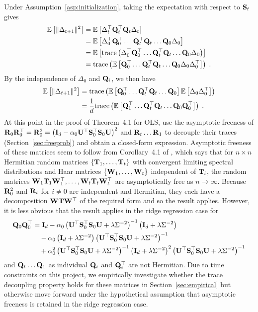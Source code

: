 Under Assumption~\ref{asp:initialization}, taking the expectation with respect to $\mathbf{S}_t$ gives
\begin{align*}
\mathbb{E}\left[\|\Delta_{t+1}\|^2\right] &= \mathbb{E}\left[\Delta_t^\top\mathbf{Q}_t^\top\mathbf{Q}_t\Delta_t\right] \\
&= \mathbb{E}\left[\Delta_0^\top\mathbf{Q}_0^\top\ldots \mathbf{Q}_t^\top\mathbf{Q}_t\ldots\mathbf{Q}_0\Delta_0\right] \\
&= \mathbb{E}\left[\mathrm{trace}\left(\Delta_0^\top\mathbf{Q}_0^\top\ldots \mathbf{Q}_t^\top\mathbf{Q}_t\ldots\mathbf{Q}_0\Delta_0\right)\right] \\
&= \mathrm{trace}\left(\mathbb{E}\left[\mathbf{Q}_0^\top\ldots \mathbf{Q}_t^\top\mathbf{Q}_t\ldots\mathbf{Q}_0\Delta_0\Delta_0^\top\right]\right) \;.
\end{align*}
By the independence of $\Delta_0$ and $\mathbf{Q}_i$, we then have
\begin{align*}
\mathbb{E}\left[\|\Delta_{t+1}\|^2\right] &= \mathrm{trace}\left(\mathbb{E}\left[\mathbf{Q}_0^\top\ldots \mathbf{Q}_t^\top\mathbf{Q}_t\ldots\mathbf{Q}_0\right]\mathbb{E}\left[\Delta_0\Delta_0^\top\right]\right) \\
&= \frac{1}{d}\mathrm{trace}\left(\mathbb{E}\left[\mathbf{Q}_1^\top\ldots \mathbf{Q}_t^\top\mathbf{Q}_t\ldots\mathbf{Q}_0\mathbf{Q}_0^\top\right]\right) \;.
\end{align*}
At this point in the proof of Theorem~4.1 for OLS, \citet{Lacotte:2020} use the asymptotic freeness of $\mathbf{R}_0\mathbf{R}_0^\top=\mathbf{R}_0^2=\left(\mathbf{I}_d-\alpha_0\mathbf{U}^\top\mathbf{S}_0^\top\mathbf{S}_0\mathbf{U}\right)^2$ and $\mathbf{R}_t\ldots\mathbf{R}_1$ to decouple their traces (Section~\ref{sec:freeprob}) and obtain a closed-form expression. Asymptotic freeness of these matrices seem to follow from Corollary~4.1 of \citep{Couillet:2011_free}, which says that for $n\times n$ Hermitian random matrices $\{\mathbf{T}_1,\ldots,\mathbf{T}_t\}$ with convergent limiting spectral distributions and Haar matrices $\{\mathbf{W}_1,\ldots,\mathbf{W}_t\}$ independent of $\mathbf{T}_i$, the random matrices $\mathbf{W}_1\mathbf{T}_1\mathbf{W}_1^\top,\ldots,\mathbf{W}_t\mathbf{T}_t\mathbf{W}_t^\top$ are asymptotically free as $n\rightarrow\infty$. Because $\mathbf{R}_0^2$ and $\mathbf{R}_i$ for $i\neq 0$ are independent and Hermitian, they each have a decomposition $\mathbf{W}\mathbf{T}\mathbf{W}^\top$ of the required form and so the result applies. However, it is less obvious that the result applies in the ridge regression case for
\begin{align*}
\mathbf{Q}_0\mathbf{Q}_0^\top &= \mathbf{I}_d - \alpha_0\left(\mathbf{U}^\top\mathbf{S}_0^\top\mathbf{S}_0\mathbf{U} + \lambda\Sigma^{-2}\right)^{-1}\left(\mathbf{I}_d + \lambda\Sigma^{-2}\right) \\
&\quad -  \alpha_0\left(\mathbf{I}_d + \lambda\Sigma^{-2}\right)\left(\mathbf{U}^\top\mathbf{S}_0^\top\mathbf{S}_0\mathbf{U} + \lambda\Sigma^{-2}\right)^{-1} \\
&\quad + \alpha_0^2\left(\mathbf{U}^\top\mathbf{S}_0^\top\mathbf{S}_0\mathbf{U} + \lambda\Sigma^{-2}\right)^{-1}\left(\mathbf{I}_d + \lambda\Sigma^{-2}\right)^2\left(\mathbf{U}^\top\mathbf{S}_0^\top\mathbf{S}_0\mathbf{U} + \lambda\Sigma^{-2}\right)^{-1}
\end{align*}
and $\mathbf{Q}_t\ldots\mathbf{Q}_1$ as individual $\mathbf{Q}_i$ and $\mathbf{Q}_i^\top$ are not Hermitian. Due to time constraints on this project, we empirically investigate whether the trace decoupling property holds for these matrices in Section~\ref{sec:empirical} but otherwise move forward under the hypothetical assumption that asymptotic freeness is retained in the ridge regression case.

